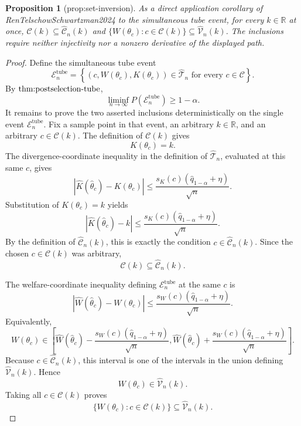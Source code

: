 \documentclass{article}
\newtheorem{proposition}{Proposition}
\begin{document}
\begin{proposition}[prop:set-inversion]\label{prop:set-inversion}
As a direct application corollary of RenTelschowSchwartzman2024 to the simultaneous tube event, for every \(k\in\mathbb R\) at once, \(\mathcal C(k)\subseteq\widehat{\mathcal C}_n(k)\) and \(\{W(\theta_c):c\in\mathcal C(k)\}\subseteq\widehat{\mathcal V}_n(k)\). The inclusions require neither injectivity nor a nonzero derivative of the displayed path.
\end{proposition}
\begin{proof}
Define the simultaneous tube event
\[
 \mathcal E_n^{\mathrm{tube}}
 =\left\{(c,W(\theta_c),K(\theta_c))\in\widehat{\mathcal T}_n
          \text{ for every }c\in\mathcal C\right\}.
\]
By \(\textnormal{thm:postselection-tube}\),
\[
 \liminf_{n\to\infty}P(\mathcal E_n^{\mathrm{tube}})\ge 1-\alpha.
\]
It remains to prove the two asserted inclusions deterministically on the single
event \(\mathcal E_n^{\mathrm{tube}}\).  Fix a sample point in that event, an
arbitrary \(k\in\mathbb R\), and an arbitrary \(c\in\mathcal C(k)\).  The
definition of \(\mathcal C(k)\) gives
\[
 K(\theta_c)=k.
\]
The divergence-coordinate inequality in the definition of
\(\widehat{\mathcal T}_n\), evaluated at this same \(c\), gives
\[
 \left|\widehat K(\widehat\theta_c)-K(\theta_c)\right|
 \le
 \frac{s_K(c)(\widehat q_{1-\alpha}+\eta)}{\sqrt n}.
\]
Substitution of \(K(\theta_c)=k\) yields
\[
 \left|\widehat K(\widehat\theta_c)-k\right|
 \le
 \frac{s_K(c)(\widehat q_{1-\alpha}+\eta)}{\sqrt n}.
\]
By the definition of \(\widehat{\mathcal C}_n(k)\), this is exactly the
condition \(c\in\widehat{\mathcal C}_n(k)\).  Since the chosen
\(c\in\mathcal C(k)\) was arbitrary,
\[
 \mathcal C(k)\subseteq\widehat{\mathcal C}_n(k).
\]

The welfare-coordinate inequality defining \(\mathcal E_n^{\mathrm{tube}}\)
at the same \(c\) is
\[
 \left|\widehat W(\widehat\theta_c)-W(\theta_c)\right|
 \le
 \frac{s_W(c)(\widehat q_{1-\alpha}+\eta)}{\sqrt n}.
\]
Equivalently,
\[
 W(\theta_c)\in
 \left[
 \widehat W(\widehat\theta_c)
   -\frac{s_W(c)(\widehat q_{1-\alpha}+\eta)}{\sqrt n},
 \widehat W(\widehat\theta_c)
   +\frac{s_W(c)(\widehat q_{1-\alpha}+\eta)}{\sqrt n}
 \right].
\]
Because \(c\in\widehat{\mathcal C}_n(k)\), this interval is one of the
intervals in the union defining \(\widehat{\mathcal V}_n(k)\).  Hence
\[
 W(\theta_c)\in\widehat{\mathcal V}_n(k).
\]
Taking all \(c\in\mathcal C(k)\) proves
\[
 \{W(\theta_c):c\in\mathcal C(k)\}
 \subseteq\widehat{\mathcal V}_n(k).
\]


\end{proof}
\end{document}
